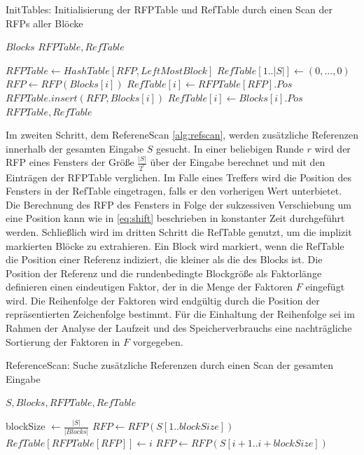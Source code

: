 \begin{algorithm}[ht]
    \centering
    \caption{InitTables: Initialisierung der RFPTable und RefTable durch einen Scan der RFPs aller Blöcke} \label{alg:inittables}
    \algorithmicrequire $Blocks$
    \algorithmicensure $RFPTable, RefTable$
    \begin{algorithmic}[1]
        \STATE $RFPTable \gets HashTable[RFP, LeftMostBlock]$
        \STATE $RefTable[1..|S|] \gets (0,...,0)$
            \STATE $RFP \gets RFP(Blocks[i])$
                \STATE $RefTable[i] \gets RFPTable[RFP].Pos$
            \ELSE
                \STATE $RFPTable.insert(RFP,Blocks[i])$
                \STATE $RefTable[i] \gets Blocks[i].Pos$
            \ENDIF
        \ENDFOR
        \RETURN $RFPTable, RefTable$
    \end{algorithmic}
\end{algorithm}

Im zweiten Schritt, dem RefereneScan \ref{alg:refscan}, werden zusätzliche Referenzen innerhalb der gesamten Eingabe $S$ gesucht. In einer beliebigen Runde $r$ wird der RFP eines Fensters der Größe $\frac{|S|}{2^r}$ 
über der Eingabe berechnet und mit den Einträgen der RFPTable verglichen. Im Falle eines Treffers wird die Position des Fensters in der RefTable eingetragen, falls er den vorherigen Wert unterbietet. Die Berechnung
des RFP des Fensters in Folge der sukzessiven Verschiebung um eine Position kann wie in \ref{eq:shift} beschrieben in konstanter Zeit durchgeführt werden.
Schließlich wird im dritten Schritt die RefTable genutzt, um die implizit markierten Blöcke zu extrahieren. Ein Block wird markiert, wenn die RefTable die Position einer Referenz indiziert, die kleiner als die
des Blocks ist. Die Position der Referenz und die rundenbedingte Blockgröße als Faktorlänge definieren einen eindeutigen Faktor, der in die Menge der Faktoren $F$ eingefügt wird. Die Reihenfolge der Faktoren
wird endgültig durch die Position der repräsentierten Zeichenfolge bestimmt. Für die Einhaltung der Reihenfolge sei im Rahmen der Analyse der Laufzeit und des Speicherverbrauchs eine nachträgliche Sortierung
der Faktoren in $F$ vorgegeben.

\begin{algorithm}[ht]
\centering
\caption{ReferenceScan: Suche zusätzliche Referenzen durch einen Scan der gesamten Eingabe} \label{alg:refscan}
\algorithmicrequire $S, Blocks, RFPTable, RefTable$
\begin{algorithmic} [1]
    \STATE blockSize $\gets \frac{|S|}{|Blocks|}$
    \STATE $RFP \gets RFP(S[1..blockSize])$
            \STATE $RefTable[RFPTable[RFP]] \gets i$
        \ENDIF
        \STATE $RFP \gets RFP(S[i+1..i+blockSize])$ 
    \ENDFOR
\end{algorithmic}
\end{algorithm}


